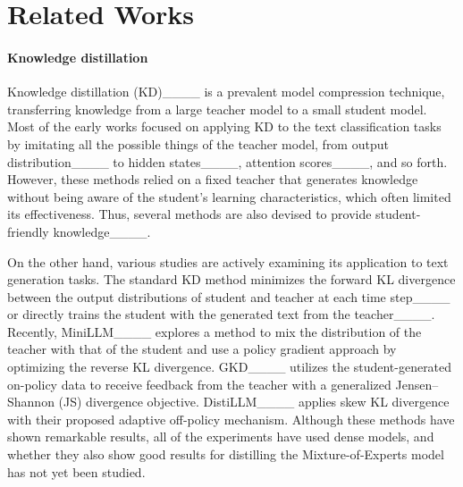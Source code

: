 \section{Related Works}
\paragraph{Knowledge distillation}
Knowledge distillation (KD)____ is a prevalent model compression technique, transferring knowledge from a large teacher model to a small student model.
Most of the early works focused on applying KD to the text classification tasks by imitating all the possible things of the teacher model, from output distribution____ to hidden states____, attention scores____, and so forth.
However, these methods relied on a fixed teacher that generates knowledge without being aware of the student’s learning characteristics, which often limited its effectiveness.
Thus, several methods are also devised to provide student-friendly knowledge____.

On the other hand, various studies are actively examining its application to text generation tasks.
The standard KD method minimizes the forward KL divergence between the output distributions of student and teacher at each time step____ or directly trains the student with the generated text from the teacher____.
Recently, MiniLLM____ explores a method to mix the distribution of the teacher with that of the student and use a policy gradient approach by optimizing the reverse KL divergence.
GKD____ utilizes the student-generated on-policy data to receive feedback from the teacher with a generalized Jensen–Shannon (JS) divergence objective.
DistiLLM____ applies skew KL divergence with their proposed adaptive off-policy mechanism.
Although these methods have shown remarkable results, all of the experiments have used dense models, and whether they also show good results for distilling the Mixture-of-Experts model has not yet been studied.


